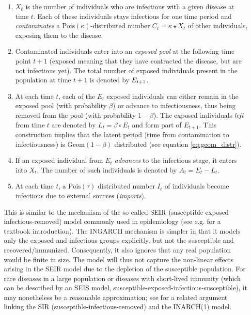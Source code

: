 \documentclass{article}
\begin{document}
\begin{enumerate}
\item $X_t$ is the number of individuals who are infectious with a given disease at time $t$. Each of these individuals stays infectious for one time period and \textit{contaminates} a $\text{Pois}(\kappa)$-distributed number $C_t = \kappa \star X_t$ of other individuals, exposing them to the disease.
\item Contaminated individuals enter into an \textit{exposed pool} at the following time point $t + 1$ (exposed meaning that they have contracted the disease, but are not infectious yet). The total number of exposed individuals present in the population at time $t + 1$ is denoted by $E_{t + 1}$.
\item At each time $t$, each of the $E_t$ exposed individuals can either remain in the exposed pool (with probability $\beta$) or advance to infectiousness, thus being removed from the pool (with probability $1 - \beta$). The exposed individuals \textit{left} from time $t$ are denoted by $L_t = \beta \circ E_t$ and form part of $E_{t + 1}$. This construction implies that the latent period (time from contamination to infectiousness) is $\text{Geom}(1- \beta)$ distributed (see equation \eqref{eq:geom_distr}).
\item If an exposed individual from $E_t$ \textit{advances} to the infectious stage, it enters into $X_t$. The number of such individuals is denoted by $A_t = E_t - L_t$.
\item At each time $t$, a $\text{Pois}(\tau)$ distributed number $I_t$ of individuals become infectious due to external sources (\textit{imports}).
\end{enumerate}
This is similar to the mechanism of the so-called SEIR (susceptible-exposed-infectious-removed) model commonly used in epidemiology (see e.g. \citep{Britton2019} for a textbook introduction). The INGARCH mechanism is simpler in that it models only the exposed and infectious groups explicitly, but not the susceptible and recovered/immunized. Consequently, it also ignores that any real population would be finite in size. The model will thus not capture the non-linear effects arising in the SEIR model due to the depletion of the susceptible population. For rare diseases in a large population or diseases with short-lived immunity (which can be described by an SEIS model, susceptible-exposed-infectious-susceptible), it may nonetheless be a reasonable approximation; see \citep{Bauer2018} for a related argument linking the SIR (susceptible-infectious-removed) and the INARCH(1) model.
\end{document}
